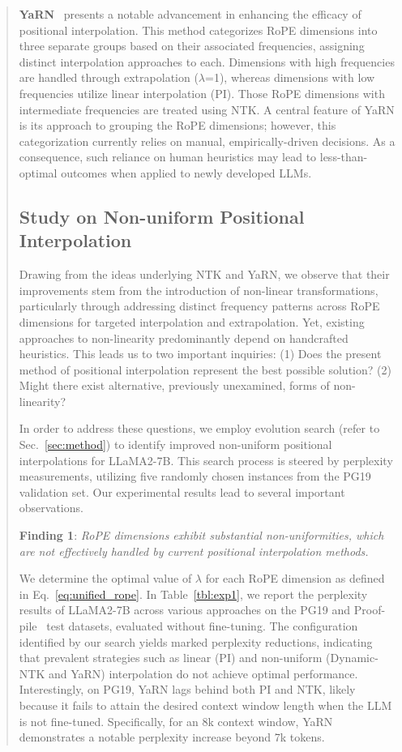 \begin{abstract}
\textbf{YaRN}~\cite{yarn} presents a notable advancement in enhancing the efficacy of positional interpolation. This method categorizes RoPE dimensions into three separate groups based on their associated frequencies, assigning distinct interpolation approaches to each. Dimensions with high frequencies are handled through extrapolation ($\lambda$=1), whereas dimensions with low frequencies utilize linear interpolation (PI). Those RoPE dimensions with intermediate frequencies are treated using NTK. A central feature of YaRN is its approach to grouping the RoPE dimensions; however, this categorization currently relies on manual, empirically-driven decisions. As a consequence, such reliance on human heuristics may lead to less-than-optimal outcomes when applied to newly developed LLMs.

\subsection{Study on Non-uniform Positional Interpolation}

Drawing from the ideas underlying NTK and YaRN, we observe that their improvements stem from the introduction of non-linear transformations, particularly through addressing distinct frequency patterns across RoPE dimensions for targeted interpolation and extrapolation. Yet, existing approaches to non-linearity predominantly depend on handcrafted heuristics. This leads us to two important inquiries: (1) Does the present method of positional interpolation represent the best possible solution? (2) Might there exist alternative, previously unexamined, forms of non-linearity?

In order to address these questions, we employ evolution search (refer to Sec.~\ref{sec:method}) to identify improved non-uniform positional interpolations for LLaMA2-7B. This search process is steered by perplexity measurements, utilizing five randomly chosen instances from the PG19~\cite{pg19} validation set. Our experimental results lead to several important observations.

\textbf{Finding 1}: \textit{RoPE dimensions exhibit substantial non-uniformities, which are not effectively handled by current positional interpolation methods.}

We determine the optimal value of $\lambda$ for each RoPE dimension as defined in Eq.~\ref{eq:unified_rope}. In Table~\ref{tbl:exp1}, we report the perplexity results of LLaMA2-7B across various approaches on the PG19 and Proof-pile~\cite{proof-pile} test datasets, evaluated without fine-tuning. The configuration identified by our search yields marked perplexity reductions, indicating that prevalent strategies such as linear (PI) and non-uniform (Dynamic-NTK and YaRN) interpolation do not achieve optimal performance. Interestingly, on PG19, YaRN lags behind both PI and NTK, likely because it fails to attain the desired context window length when the LLM is not fine-tuned. Specifically, for an 8k context window, YaRN demonstrates a notable perplexity increase beyond 7k tokens.


\end{abstract}
